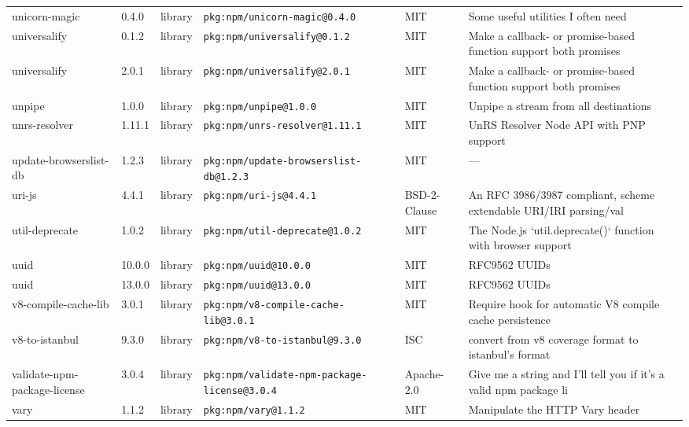 \documentclass[11pt,a4paper]{article}
\begin{document}
\begin{longtable}{|p{4cm}|p{2cm}|p{1.6cm}|p{5cm}|p{1.5cm}|p{3.5cm}|}
\raggedright unicorn-magic & 0.4.0 & library & \small\texttt{pkg:npm/unicorn-magic@0.4.0} & MIT & \small Some useful utilities I often need \\
\raggedright universalify & 0.1.2 & library & \small\texttt{pkg:npm/universalify@0.1.2} & MIT & \small Make a callback- or promise-based function support both promises  \\
\raggedright universalify & 2.0.1 & library & \small\texttt{pkg:npm/universalify@2.0.1} & MIT & \small Make a callback- or promise-based function support both promises  \\
\raggedright unpipe & 1.0.0 & library & \small\texttt{pkg:npm/unpipe@1.0.0} & MIT & \small Unpipe a stream from all destinations \\
\raggedright unrs-resolver & 1.11.1 & library & \small\texttt{pkg:npm/unrs-resolver@1.11.1} & MIT & \small UnRS Resolver Node API with PNP support \\
\raggedright update-browserslist-db & 1.2.3 & library & \small\texttt{pkg:npm/update-browserslist-db@1.2.3} & MIT & \small — \\
\raggedright uri-js & 4.4.1 & library & \small\texttt{pkg:npm/uri-js@4.4.1} & BSD-2-Clause & \small An RFC 3986/3987 compliant, scheme extendable URI/IRI parsing/val \\
\raggedright util-deprecate & 1.0.2 & library & \small\texttt{pkg:npm/util-deprecate@1.0.2} & MIT & \small The Node.js `util.deprecate()` function with browser support \\
\raggedright uuid & 10.0.0 & library & \small\texttt{pkg:npm/uuid@10.0.0} & MIT & \small RFC9562 UUIDs \\
\raggedright uuid & 13.0.0 & library & \small\texttt{pkg:npm/uuid@13.0.0} & MIT & \small RFC9562 UUIDs \\
\raggedright v8-compile-cache-lib & 3.0.1 & library & \small\texttt{pkg:npm/v8-compile-cache-lib@3.0.1} & MIT & \small Require hook for automatic V8 compile cache persistence \\
\raggedright v8-to-istanbul & 9.3.0 & library & \small\texttt{pkg:npm/v8-to-istanbul@9.3.0} & ISC & \small convert from v8 coverage format to istanbul's format \\
\raggedright validate-npm-package-license & 3.0.4 & library & \small\texttt{pkg:npm/validate-npm-package-license@3.0.4} & Apache-2.0 & \small Give me a string and I'll tell you if it's a valid npm package li \\
\raggedright vary & 1.1.2 & library & \small\texttt{pkg:npm/vary@1.1.2} & MIT & \small Manipulate the HTTP Vary header \\

\end{longtable}
\end{document}
